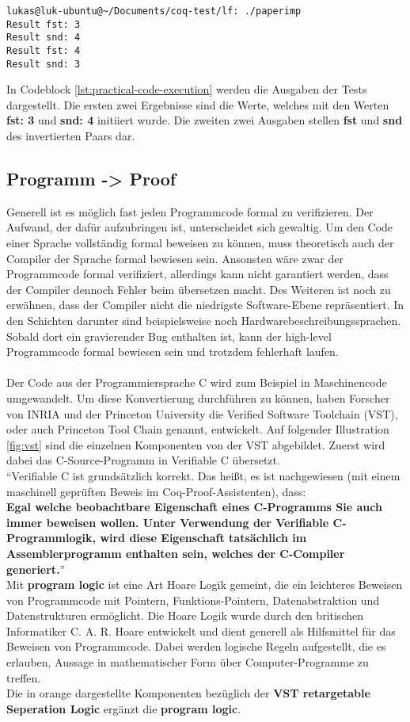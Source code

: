 \begin{lstlisting}[language=coq,firstnumber=1,caption=Ocaml code ausführen,label=lst:practical-code-execution]
lukas@luk-ubuntu@~/Documents/coq-test/lf: ./paperimp
Result fst: 3 
Result snd: 4 
Result fst: 4 
Result snd: 3 
\end{lstlisting}
In Codeblock \ref{lst:practical-code-execution} werden die Ausgaben der Tests dargestellt. Die ersten zwei Ergebnisse sind die Werte, welches mit den Werten \textbf{fst: 3} und \textbf{snd: 4} initiiert wurde. Die zweiten zwei Ausgaben stellen \textbf{fst} und \textbf{snd} des invertierten Paars dar.

\subsection{Programm -> Proof}
Generell ist es möglich fast jeden Programmcode formal zu verifizieren. Der Aufwand, der dafür aufzubringen ist, unterscheidet sich gewaltig. Um den Code einer Sprache vollständig formal beweisen zu können, muss theoretisch auch der Compiler der Sprache formal bewiesen sein. Ansonsten wäre zwar der Programmcode formal verifiziert, allerdings kann nicht garantiert werden, dass der Compiler dennoch Fehler beim übersetzen macht. Des Weiteren ist noch zu erwähnen, dass der Compiler nicht die niedrigste Software-Ebene repräsentiert. In den Schichten darunter sind beispielsweise noch Hardwarebeschreibungssprachen. Sobald dort ein gravierender Bug enthalten ist, kann der high-level Programmcode formal bewiesen sein und trotzdem fehlerhaft laufen.\\
\\
Der Code aus der Programmiersprache C wird zum Beispiel in Maschinencode umgewandelt. 
Um diese Konvertierung durchführen zu können, haben Forscher von INRIA und der Princeton University die Verified Software Toolchain (VST), oder auch Princeton Tool Chain genannt, entwickelt. Auf folgender Illustration \ref{fig:vst} sind die einzelnen Komponenten von der VST abgebildet. Zuerst wird dabei das C-Source-Programm in Verifiable C übersetzt. \\
"`Verifiable C ist grundsätzlich korrekt. Das heißt, es ist nachgewiesen (mit einem maschinell geprüften
Beweis im Coq-Proof-Assistenten), dass:\\
\textbf{Egal welche beobachtbare Eigenschaft eines C-Programms Sie auch immer beweisen wollen. Unter Verwendung der Verifiable C-Programmlogik, wird diese Eigenschaft
tatsächlich im Assemblerprogramm enthalten sein, welches der C-Compiler generiert.}"'\\
Mit \textbf{program logic} ist eine Art Hoare Logik gemeint, die ein leichteres Beweisen von Programmcode mit Pointern, Funktions-Pointern, Datenabstraktion und Datenstrukturen ermöglicht.\cite{Appel02:VST} Die Hoare Logik wurde durch den britischen Informatiker C. A. R. Hoare entwickelt und dient generell als Hilfsmittel für das Beweisen von Programmcode. Dabei werden logische Regeln aufgestellt, die es erlauben, Aussage in mathematischer Form über Computer-Programme zu treffen.\\
Die in orange dargestellte Komponenten bezüglich der \textbf{VST retargetable Seperation Logic} ergänzt die \textbf{program logic}.




